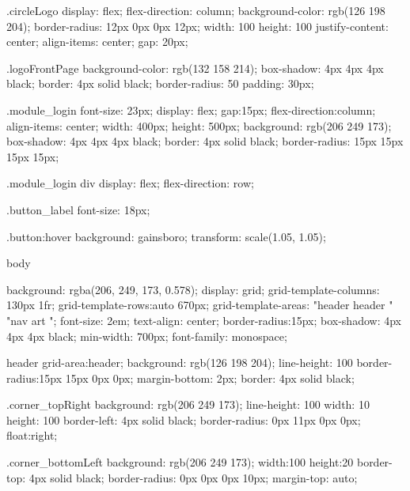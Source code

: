 \documentclass[12pt]{article} %
\begin{document}
\begin{htmlcode}[caption={CSS Stlye Sheet}]
    .circleLogo
    {
       display: flex;
       flex-direction: column;
       background-color: rgb(126 198 204);
       border-radius: 12px 0px 0px 12px;
       width: 100%
       height: 100%
       justify-content: center;
       align-items: center;
       gap: 20px;
    }
        
    
    .logoFrontPage
    {
       background-color: rgb(132 158 214);
       box-shadow: 4px 4px 4px black;
       border: 4px solid black;
       border-radius: 50%
       padding: 30px;
    }
    
    
    .module_login
    {
       font-size: 23px;
       display: flex;
       gap:15px;
       flex-direction:column;
       align-items: center;
       width: 400px;
       height: 500px;
       background: rgb(206 249 173);
       box-shadow: 4px 4px 4px black;
       border: 4px solid black;
       border-radius: 15px 15px 15px 15px;
    }
        
    .module_login div 
    {
       display: flex;
       flex-direction: row;       
    }
        
     .button_label
    {
       font-size: 18px;
    }
        
    .button:hover
    {
       background: gainsboro;
       transform: scale(1.05, 1.05);
    }
        
    body
    {
      
       background: rgba(206, 249, 173, 0.578);
       display: grid;
       grid-template-columns: 130px 1fr;
       grid-template-rows:auto 670px;
       grid-template-areas: 
       "header header "
       "nav art ";
       font-size: 2em;
       text-align: center;
       border-radius:15px;
       box-shadow: 4px 4px 4px black;
       min-width: 700px;
       font-family: monospace;
    }
        
        
    header 
    {
       grid-area:header;
       background: rgb(126 198 204);
       line-height: 100%
       border-radius:15px 15px 0px 0px;
       margin-bottom: 2px;
       border: 4px solid black;
    }
        
    .corner_topRight
    {
       background: rgb(206 249 173);
       line-height: 100%
       width: 10%
       height: 100%
       border-left: 4px solid black;
       border-radius: 0px 11px 0px 0px;
       float:right;
    }
        
    .corner_bottomLeft
    {
       background: rgb(206 249 173);
       width:100%
       height:20%
       border-top: 4px solid black;
       border-radius: 0px 0px 0px 10px;
       margin-top: auto;       
    }
        

\end{htmlcode}
\end{document}

